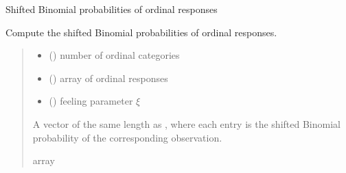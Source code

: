\documentclass[letterpaper,10pt,english]{sphinxmanual}
\begin{document}

\begin{fulllineitems}
\label{\detokenize{cubmods:cubmods.general.bitxi}}
\pysigstartsignatures
{}
\pysigstopsignatures
\sphinxAtStartPar
Shifted Binomial probabilities of ordinal responses

\sphinxAtStartPar
Compute the shifted Binomial probabilities of ordinal responses.
\begin{quote}\begin{description}
\begin{itemize}
\item {} 
\sphinxAtStartPar
{} () \textendash{} number of ordinal categories

\item {} 
\sphinxAtStartPar
{} () \textendash{} array of ordinal responses

\item {} 
\sphinxAtStartPar
{} () \textendash{} feeling parameter \(\xi\)

\end{itemize}

\sphinxAtStartPar
A vector of the same length as , where each entry is the shifted Binomial probability 
of the corresponding observation.

\sphinxAtStartPar
array

\end{description}\end{quote}

\end{fulllineitems}

\end{document}
